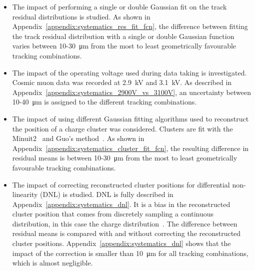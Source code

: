 \begin{itemize}
  \item The impact of performing a single or double Gaussian fit on the track residual distributions is studied. As shown in Appendix~\ref{appendix:systematics_res_fit_fcn}, the difference between fitting the track residual distribution with a single or double Gaussian function varies between 10-\SI{30}{\micro\meter} from the most to least geometrically favourable tracking combinations.
  \item The impact of the operating voltage used during data taking is investigated. Cosmic muon data was recorded at 2.9~kV and 3.1~kV. As described in Appendix~\ref{appendix:systematics_2900V_vs_3100V}, an uncertainty between 10-\SI{40}{\micro\meter} is assigned to the different tracking combinations.
  \item The impact of using different Gaussian fitting algorithms used to reconstruct the position of a charge cluster was considered. Clusters are fit with the Minuit2~\cite{hatlo_developments_2005} and Guo's method~\cite{guo_simple_2011}. As shown in Appendix~\ref{appendix:systematics_cluster_fit_fcn}, the resulting difference in residual means is between 10-\SI{30}{\micro\meter} from the most to least geometrically favourable tracking combinations.
  \item The impact of correcting reconstructed cluster positions for differential non-linearity (DNL) is studied. DNL is fully described in Appendix~\ref{appendix:systematics_dnl}. It is a bias in the reconstructed cluster position that comes from discretely sampling a continuous distribution, in this case the charge distribution~\cite{endo_systematic_1981, lefebvre_thesis, abusleme_performance_2016}. The difference between residual means is compared with and without correcting the reconstructed cluster positions. Appendix~\ref{appendix:systematics_dnl} shows that the impact of the correction is smaller than \SI{10}{\micro\meter} for all tracking combinations, which is almost negligible.
\end{itemize}

